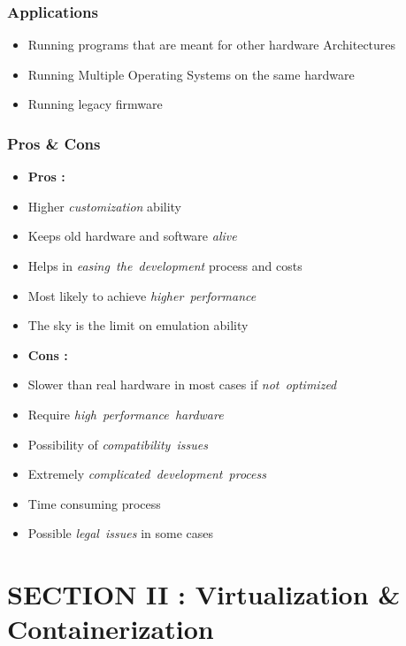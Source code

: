 \documentclass[
  14pt,
  english,
  a4paper,
]{scrreprt}
\providecommand{\tightlist}{%
  \setlength{\itemsep}{0pt}\setlength{\parskip}{0pt}}
\begin{document}
\hypertarget{applications-1}{%
\subsubsection{Applications}\label{applications-1}}

\begin{itemize}
\tightlist
\item
  Running programs that are meant for other hardware Architectures
\item
  Running Multiple Operating Systems on the same hardware
\item
  Running legacy firmware
\end{itemize}

\hypertarget{pros-cons}{%
\subsubsection{Pros \& Cons}\label{pros-cons}}

\begin{itemize}
\item
  \textbf{Pros :}
\item
  Higher \emph{customization} ability
\item
  Keeps old hardware and software \emph{alive}
\item
  Helps in \emph{easing~the~development} process and costs
\item
  Most likely to achieve \emph{higher~performance}
\item
  The sky is the limit on emulation ability
\item
  \textbf{Cons :}
\item
  Slower than real hardware in most cases if \emph{not~optimized}
\item
  Require \emph{high~performance~hardware}
\item
  Possibility of \emph{compatibility~issues}
\item
  Extremely \emph{complicated~development~process}
\item
  Time consuming process
\item
  Possible \emph{legal~issues} in some cases
\end{itemize}

\hypertarget{section-ii-virtualization-containerization}{%
\section{SECTION II : Virtualization \&
Containerization}\label{section-ii-virtualization-containerization}}
\end{document}
